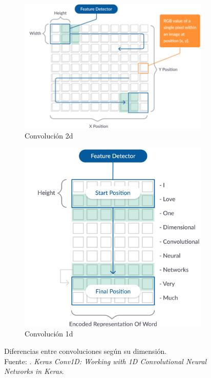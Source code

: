 \begin{itemize}
	\begin{figure}[!ht]
		\centering
		\small
		\begin{subfigure}{.5\textwidth}
			\centering
			\includegraphics[width=1.00\linewidth]{2/figures/2D-convolutional-example.png}
			\caption{Convolución 2d}
		\end{subfigure}%
		\begin{subfigure}{.5\textwidth}
			\centering
			\includegraphics[width=0.85\linewidth]{2/figures/1D-convolutional-example.png}
			\caption{Convolución 1d}
		\end{subfigure}
		\caption[Diferencias entre convoluciones según su dimensión]{Diferencias entre convoluciones según su dimensión.\\
		Fuente: \cite{tec_missinglink_conv1d}. \textit{Keras Conv1D: Working with 1D Convolutional Neural Networks in Keras}.}
		\label{2:fig41}
	\end{figure}
	

\end{itemize}
